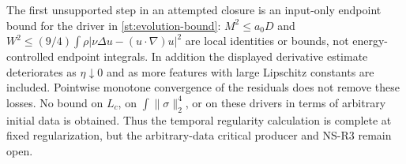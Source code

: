 The first unsupported step in an attempted closure is an input-only
endpoint bound for the driver in \eqref{st:evolution-bound}:
$M^2\le a_0D$ and
$W^2\le(9/4)\int\rho|\nu\Delta u-(u\cdot\nabla)u|^2$ are local
identities or bounds, not energy-controlled endpoint integrals. In
addition the displayed derivative estimate deteriorates as $\eta\downarrow0$
and as more features with large Lipschitz constants are included.
Pointwise monotone convergence of the residuals does not remove these
losses. No bound on $L_c$, on $\int\|\sigma\|_2^4$, or on these drivers
in terms of arbitrary initial data is obtained. Thus the temporal
regularity calculation is complete at fixed regularization, but the
arbitrary-data critical producer and NS-R3 remain open.
